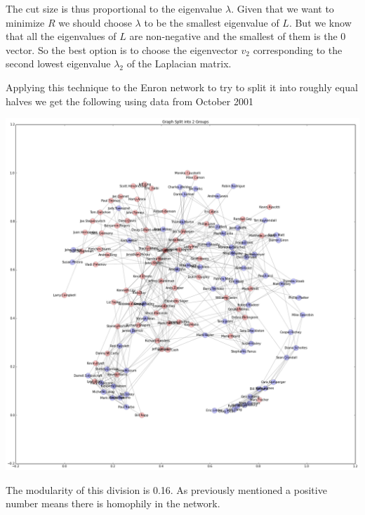 \documentclass[12pt]{article}
\begin{document}
	The cut size is thus proportional to the eigenvalue $\lambda$. Given that we want to minimize $R$ we should choose $\lambda$ to be the smallest eigenvalue of $L$. But we know that all the eigenvalues of $L$ are non-negative and the smallest of them is the 0 vector.  So the best option is to choose the eigenvector $v_2$ corresponding to the second lowest eigenvalue $\lambda_2$ of the Laplacian matrix. 

	Applying this technique to the Enron network to try to split it into roughly equal halves we get the following using data from October 2001
	
	\includegraphics[width=1\textwidth]{figureEnronPartition}
	
	The modularity of this division is 0.16. As previously mentioned a positive number means there is homophily in the network. 
	
\end{document}
